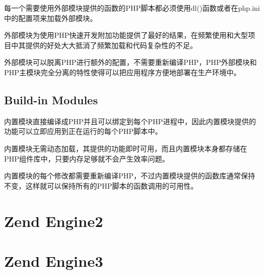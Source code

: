 每一个需要使用外部模块提供的函数的PHP脚本都必须使用dl()函数或者在php.ini中的配置项来加载外部模块。

外部模块为使用PHP快速开发附加功能提供了最好的结果，在频繁使用和大型项目中其提供的好处大大抵消了频繁加载和代码复杂性的不足。

外部模块可以脱离PHP进行额外的配置，不需要重新编译PHP，PHP外部模块和PHP主模块完全分离的特性使得可以把应用程序方便地部署在生产环境中。

\subsection{Build-in Modules}

内置模块直接编译成PHP并且可以绑定到每个PHP进程中，因此内置模块提供的功能可以立即应用到正在运行的每个PHP脚本中。

内置模块无需动态加载，其提供的功能即时可用，而且内置模块本身都存储在PHP组件库中，只要内存足够就不会产生效率问题。

内置模块的每个修改都需要重新编译PHP，不过内置模块提供的函数库通常保持不变，这样就可以保持所有的PHP脚本的函数调用的可用性。





\section{Zend Engine2}



\section{Zend Engine3}




